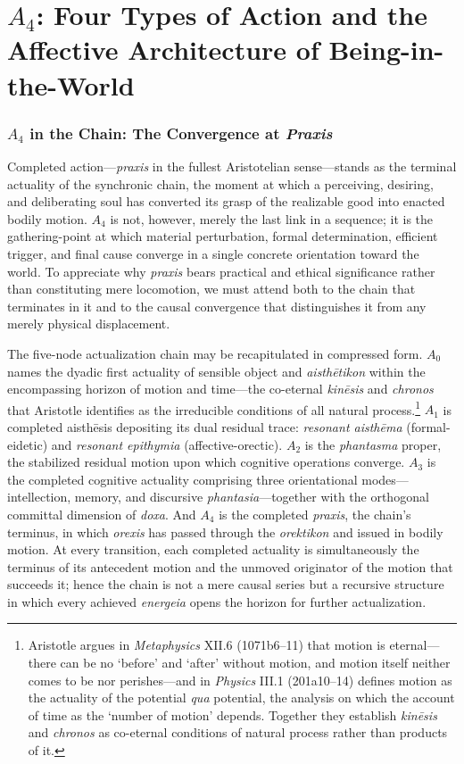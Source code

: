 \documentclass{article}
\begin{document}
\section{\texorpdfstring{$A_4$}{A4}: Four Types of Action and the Affective Architecture of Being-in-the-World}

\subsubsection*{$A_4$ in the Chain: The Convergence at \textit{Praxis}}

Completed action---\textit{praxis} in the fullest Aristotelian sense---stands as the terminal actuality of the synchronic chain, the moment at which a perceiving, desiring, and deliberating soul has converted its grasp of the realizable good into enacted bodily motion. $A_4$ is not, however, merely the last link in a sequence; it is the gathering-point at which material perturbation, formal determination, efficient trigger, and final cause converge in a single concrete orientation toward the world. To appreciate why \textit{praxis} bears practical and ethical significance rather than constituting mere locomotion, we must attend both to the chain that terminates in it and to the causal convergence that distinguishes it from any merely physical displacement.

The five-node actualization chain may be recapitulated in compressed form. $A_0$ names the dyadic first actuality of sensible object and \textit{aisth\={e}tikon} within the encompassing horizon of motion and time---the co-eternal \textit{kin\={e}sis} and \textit{chronos} that Aristotle identifies as the irreducible conditions of all natural process.\footnote{Aristotle argues in \textit{Metaphysics} XII.6 (1071b6--11) that motion is eternal---there can be no `before' and `after' without motion, and motion itself neither comes to be nor perishes---and in \textit{Physics} III.1 (201a10--14) defines motion as the actuality of the potential \textit{qua} potential, the analysis on which the account of time as the `number of motion' depends. Together they establish \textit{kin\={e}sis} and \textit{chronos} as co-eternal conditions of natural process rather than products of it.} $A_1$ is completed aisthēsis depositing its dual residual trace: \textit{resonant aisth\={e}ma} (formal-eidetic) and \textit{resonant epithymia} (affective-orectic). $A_2$ is the \textit{phantasma} proper, the stabilized residual motion upon which cognitive operations converge. $A_3$ is the completed cognitive actuality comprising three orientational modes---intellection, memory, and discursive \textit{phantasia}---together with the orthogonal committal dimension of \textit{doxa}. And $A_4$ is the completed \textit{praxis}, the chain's terminus, in which \textit{orexis} has passed through the \textit{orektikon} and issued in bodily motion. At every transition, each completed actuality is simultaneously the terminus of its antecedent motion and the unmoved originator of the motion that succeeds it; hence the chain is not a mere causal series but a recursive structure in which every achieved \textit{energeia} opens the horizon for further actualization.
\end{document}
